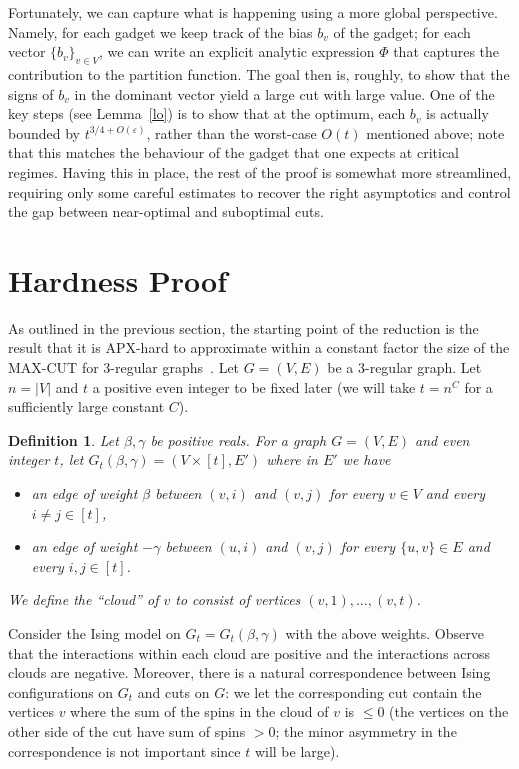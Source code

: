 \documentclass[11pt]{article}
\newtheorem{definition}[theorem]{Definition}
\begin{document}
Fortunately, we can capture what is happening using a more global perspective. Namely, for each gadget we keep track of the bias $b_v$ of the gadget; for each vector $\{b_v\}_{v\in V}$, we can write an explicit analytic expression $\Phi$ that captures the contribution to the partition function. The goal then is, roughly, to show that the signs of $b_v$ in the dominant vector yield a large cut with large value. One of the key steps (see Lemma~\ref{lo}) is to show that at the optimum, each $b_v$ is actually bounded by $t^{3/4+O(\varepsilon)}$, rather than the worst-case $O(t)$ mentioned above; note that this matches the behaviour of the gadget that one expects at critical regimes. Having this in place, the rest of the proof is somewhat more streamlined, requiring only some careful estimates to recover the right asymptotics and control the gap between near-optimal and suboptimal cuts.





\section{Hardness Proof}

As outlined in the previous section, the starting point of the reduction is the result that it is APX-hard to approximate within a constant factor the size of the MAX-CUT for $3$-regular graphs~\cite{alimonti1997hardness}. 
Let $G=(V,E)$ be a $3$-regular graph. Let $n=|V|$ and $t$ a positive even integer to be fixed later (we will take $t=n^C$ for a sufficiently large constant $C$). 

\begin{definition}\label{def1}
Let $\beta, \gamma$ be positive reals. For a graph $G=(V,E)$ and even integer $t$, let $G_{t}(\beta,\gamma)=(V\times [t],E')$ where in $E'$ we have
\begin{itemize}\itemsep0em 
\item an edge of weight $\beta$ between $(v,i)$ and $(v,j)$ for every $v\in V$ and every $i\neq j\in [t]$,
\item an edge of weight $-\gamma$ between $(u,i)$ and $(v,j)$ for every $\{u,v\}\in E$ and every $i,j\in [t]$.
\end{itemize}
We define the ``cloud'' of $v$ to consist of vertices $(v,1),\dots,(v,t)$.
\end{definition}

Consider the Ising model on $G_t=G_t(\beta,\gamma)$ with the above weights. Observe that the interactions within each cloud are positive and the interactions across clouds are negative.  Moreover, there is a natural correspondence between Ising configurations on $G_t$ and cuts on $G$: we let the corresponding cut contain the vertices $v$ 
where the sum of the spins in the cloud of $v$ is $\leq 0$ (the vertices on the other side of the cut have sum of spins $>0$; the minor asymmetry in the correspondence is not important since $t$ will be large). 
\end{document}
